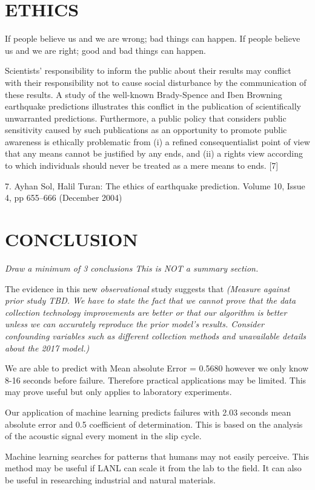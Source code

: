 \documentclass[]{llncs}
\begin{document}
\section{ETHICS}
If people believe us and we are wrong; bad things can happen. If people believe us and we are right; good and bad things can happen.

Scientists’ responsibility to inform the public about their results may conflict with their responsibility not to cause social disturbance by the communication of these results. A study of the well-known Brady-Spence and Iben Browning earthquake predictions illustrates this conflict in the publication of scientifically unwarranted predictions. Furthermore, a public policy that considers public sensitivity caused by such publications as an opportunity to promote public awareness is ethically problematic from (i) a refined consequentialist point of view that any means cannot be justified by any ends, and (ii) a rights view according to which individuals should never be treated as a mere means to ends. [7]

7.	Ayhan Sol, Halil Turan: The ethics of earthquake prediction.  Volume 10, Issue 4, pp 655–666 (December 2004)
\section{CONCLUSION}
{\em Draw a minimum of 3 conclusions  This is NOT a summary section.} 
\par



The evidence in this new {\em observational} study suggests that {\em (Measure against prior study TBD. We have to state the fact that we cannot prove that the data collection technology improvements are better or that our algorithm is better unless we can accurately reproduce the prior model's results. Consider confounding variables such as different collection methods and unavailable details about the 2017 model.)}\par

We are able to predict with Mean absolute Error = 0.5680 however we  only know 8-16 seconds before failure.
 Therefore practical applications may be limited. This may prove useful but only applies to laboratory experiments. 
 
 Our application of machine learning predicts failures with 2.03 seconds mean absolute error and 0.5 coefficient of determination. This is based on the analysis of the acoustic signal every moment in the slip cycle. 
 
 Machine learning searches for patterns that humans may not easily perceive. This method may be useful if LANL can scale it from the lab to the field. It can also be useful in researching industrial and natural materials.
 
 
 
 
\par



\end{document}

